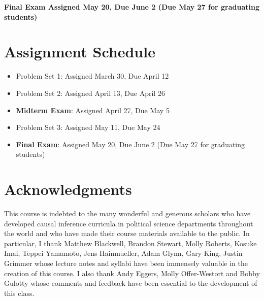 \documentclass[11pt, article, oneside]{memoir}
\theoremstyle{Assumption}
\begin{document}
\textbf{Final Exam Assigned May 20, Due June 2 (Due May 27 for graduating students)}

\section*{Assignment Schedule}

\begin{itemize}
\item Problem Set 1: Assigned March 30, Due April 12
\item Problem Set 2: Assigned April 13, Due April 26
\item \textbf{Midterm Exam}: Assigned April 27, Due May 5
\item Problem Set 3: Assigned May 11, Due May 24
\item \textbf{Final Exam}: Assigned May 20, Due June 2 (Due May 27 for graduating students)
\end{itemize}

\section*{Acknowledgments}

This course is indebted to the many wonderful and generous scholars who have developed causal inference curricula in political science departments throughout the world and who have made their course materials available to the public. In particular, I thank Matthew Blackwell, Brandon Stewart, Molly Roberts, Kosuke Imai, Teppei Yamamoto, Jens Hainmueller, Adam Glynn, Gary King, Justin Grimmer whose lecture notes and syllabi have been immensely valuable in the creation of this course. I also thank Andy Eggers, Molly Offer-Westort and Bobby Gulotty whose comments and feedback have been essential to the development of this class.
\end{document}
